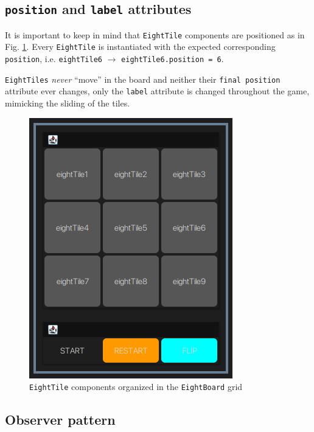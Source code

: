 \subsection{\texttt{position} and \texttt{label} attributes}
\begin{paracol}{2}
   \colfill
   It is important to keep in mind that \lstinline|EightTile| components are positioned as in Fig. \ref{fig:netBeans_board}.
   Every \lstinline|EightTile| is instantiated with the expected corresponding \lstinline|position|, i.e. \lstinline|eightTile6| $ \rightarrow $ \lstinline|eightTile6.position = 6|.

   \lstinline|EightTiles| \textit{never} ``move'' in the board and neither their \lstinline|final position| attribute ever changes, only the \lstinline|label| attribute is changed throughout the game, mimicking the sliding of the tiles.

   \colfill
   
   
   \switchcolumn
   \begin{figure}[htbp]
      \centering
      \includegraphics[width=0.4\columnwidth]{images/netBeans_board.png}
      \caption{\lstinline|EightTile| components organized in the \lstinline|EightBoard| grid}
      \label{fig:netBeans_board}
   \end{figure}
\end{paracol}

\subsection{Observer pattern}


